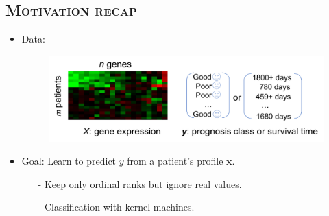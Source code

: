 \documentclass[xcolor=x11names,compress]{beamer}
\theoremstyle{plain}
\renewcommand{\(}{\begin{columns}}
\renewcommand{\)}{\end{columns}}
\newcommand{\<}[1]{\begin{column}{#1}}
\renewcommand{\>}{\end{column}}
\begin{document}
\subsection{\scshape Motivation recap}
\begin{frame}{\insertsubsection}
	
	\begin{itemize}
		\item Data: 
		\begin{figure}
			\centering
			\includegraphics[width=\linewidth]{slides/prognosis}
		\end{figure}
		
		\item Goal: Learn to predict $y$ from a patient's profile $\mathbf{x}$.
		\begin{itemize}
			\item[-] Keep only ordinal ranks but ignore real values.
			\item[-] Classification with kernel machines.
		\end{itemize}
	\end{itemize}
	
\end{frame}
\end{document}
